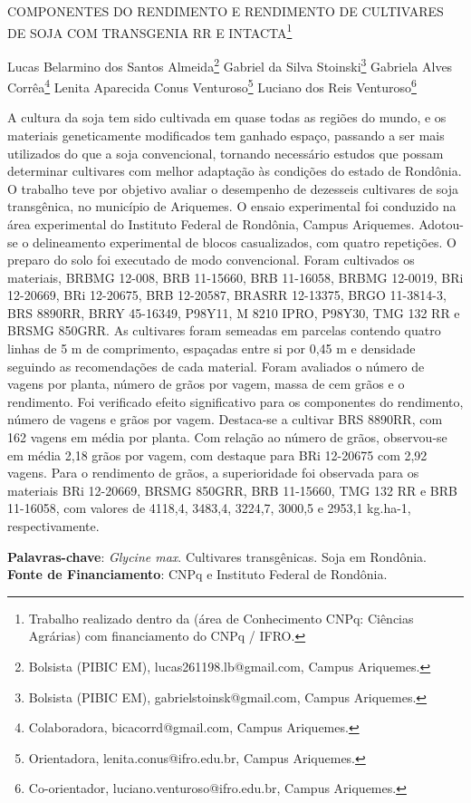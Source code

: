 \documentclass[article,12pt,onesidea,4paper,english,brazil]{abntex2}
\begin{document}
	
	
	\frenchspacing 
	
	\begin{center}
		\LARGE COMPONENTES DO RENDIMENTO E RENDIMENTO DE CULTIVARES DE SOJA
		COM TRANSGENIA RR E INTACTA\footnote{Trabalho realizado dentro da (área de Conhecimento CNPq: Ciências Agrárias) com financiamento
			do CNPq / IFRO.}
		
		\normalsize
	Lucas Belarmino dos Santos Almeida\footnote{Bolsista (PIBIC EM), lucas261198.lb@gmail.com, Campus Ariquemes.} 
		Gabriel da Silva Stoinski\footnote{Bolsista (PIBIC EM), gabrielstoinsk@gmail.com, Campus Ariquemes.} 
		Gabriela Alves Corrêa\footnote{Colaboradora, bicacorrd@gmail.com, Campus Ariquemes.} 
	Lenita
	Aparecida Conus Venturoso\footnote{Orientadora, lenita.conus@ifro.edu.br, Campus Ariquemes.}
	Luciano dos Reis Venturoso\footnote{Co-orientador, luciano.venturoso@ifro.edu.br, Campus Ariquemes.}
	 
	\end{center}
	
	\noindent A cultura da soja tem sido cultivada em quase todas as regiões do mundo, e os
	materiais geneticamente modificados tem ganhado espaço, passando a ser mais
	utilizados do que a soja convencional, tornando necessário estudos que possam
	determinar cultivares com melhor adaptação às condições do estado de Rondônia.
	O trabalho teve por objetivo avaliar o desempenho de dezesseis cultivares de soja
	transgênica, no município de Ariquemes. O ensaio experimental foi conduzido na
	área experimental do Instituto Federal de Rondônia, Campus Ariquemes. Adotou-se
	o delineamento experimental de blocos casualizados, com quatro repetições. O
	preparo do solo foi executado de modo convencional. Foram cultivados os materiais,
	BRBMG 12-008, BRB 11-15660, BRB 11-16058, BRBMG 12-0019, BRi 12-20669,
	BRi 12-20675, BRB 12-20587, BRASRR 12-13375, BRGO 11-3814-3, BRS 8890RR,
	BRRY 45-16349, P98Y11, M 8210 IPRO, P98Y30, TMG 132 RR e BRSMG 850GRR.
	As cultivares foram semeadas em parcelas contendo quatro linhas de 5 m de
	comprimento, espaçadas entre si por 0,45 m e densidade seguindo as
	recomendações de cada material. Foram avaliados o número de vagens por planta,
	número de grãos por vagem, massa de cem grãos e o rendimento. Foi verificado
	efeito significativo para os componentes do rendimento, número de vagens e grãos
	por vagem. Destaca-se a cultivar BRS 8890RR, com 162 vagens em média por
	planta. Com relação ao número de grãos, observou-se em média 2,18 grãos por
	vagem, com destaque para BRi 12-20675 com 2,92 vagens. Para o rendimento de
	grãos, a superioridade foi observada para os materiais BRi 12-20669, BRSMG
	850GRR, BRB 11-15660, TMG 132 RR e BRB 11-16058, com valores de 4118,4,
	3483,4, 3224,7, 3000,5 e 2953,1 kg.ha-1, respectivamente.
	
	\vspace{\onelineskip}
	
	\noindent
	\textbf{Palavras-chave}: \textit{Glycine max}. Cultivares transgênicas. Soja em Rondônia. \\
	\textbf{Fonte de Financiamento}: CNPq e Instituto Federal de Rondônia.
	
\end{document}
